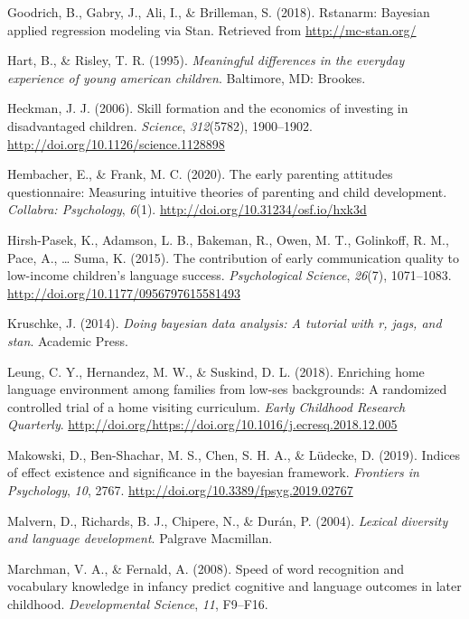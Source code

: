 \documentclass[man,floatsintext]{apa6}
\begin{document}
\leavevmode\hypertarget{ref-rstanarm}{}%
Goodrich, B., Gabry, J., Ali, I., \& Brilleman, S. (2018). Rstanarm: Bayesian applied regression modeling via Stan. Retrieved from \url{http://mc-stan.org/}

\leavevmode\hypertarget{ref-Hart1995}{}%
Hart, B., \& Risley, T. R. (1995). \emph{Meaningful differences in the everyday experience of young american children}. Baltimore, MD: Brookes.

\leavevmode\hypertarget{ref-Heckman2006}{}%
Heckman, J. J. (2006). Skill formation and the economics of investing in disadvantaged children. \emph{Science}, \emph{312}(5782), 1900--1902. \url{http://doi.org/10.1126/science.1128898}

\leavevmode\hypertarget{ref-Hembacher2020}{}%
Hembacher, E., \& Frank, M. C. (2020). The early parenting attitudes questionnaire: Measuring intuitive theories of parenting and child development. \emph{Collabra: Psychology}, \emph{6}(1). \url{http://doi.org/10.31234/osf.io/hxk3d}

\leavevmode\hypertarget{ref-HirshPasek2015}{}%
Hirsh-Pasek, K., Adamson, L. B., Bakeman, R., Owen, M. T., Golinkoff, R. M., Pace, A., \ldots{} Suma, K. (2015). The contribution of early communication quality to low-income children's language success. \emph{Psychological Science}, \emph{26}(7), 1071--1083. \url{http://doi.org/10.1177/0956797615581493}

\leavevmode\hypertarget{ref-Kruschke2014}{}%
Kruschke, J. (2014). \emph{Doing bayesian data analysis: A tutorial with r, jags, and stan}. Academic Press.

\leavevmode\hypertarget{ref-Leung2018}{}%
Leung, C. Y., Hernandez, M. W., \& Suskind, D. L. (2018). Enriching home language environment among families from low-ses backgrounds: A randomized controlled trial of a home visiting curriculum. \emph{Early Childhood Research Quarterly}. \url{http://doi.org/https://doi.org/10.1016/j.ecresq.2018.12.005}

\leavevmode\hypertarget{ref-Makowski2019}{}%
Makowski, D., Ben-Shachar, M. S., Chen, S. H. A., \& Lüdecke, D. (2019). Indices of effect existence and significance in the bayesian framework. \emph{Frontiers in Psychology}, \emph{10}, 2767. \url{http://doi.org/10.3389/fpsyg.2019.02767}

\leavevmode\hypertarget{ref-Malvern2004}{}%
Malvern, D., Richards, B. J., Chipere, N., \& Durán, P. (2004). \emph{Lexical diversity and language development}. Palgrave Macmillan.

\leavevmode\hypertarget{ref-Marchman2008}{}%
Marchman, V. A., \& Fernald, A. (2008). Speed of word recognition and vocabulary knowledge in infancy predict cognitive and language outcomes in later childhood. \emph{Developmental Science}, \emph{11}, F9--F16.
\end{document}
